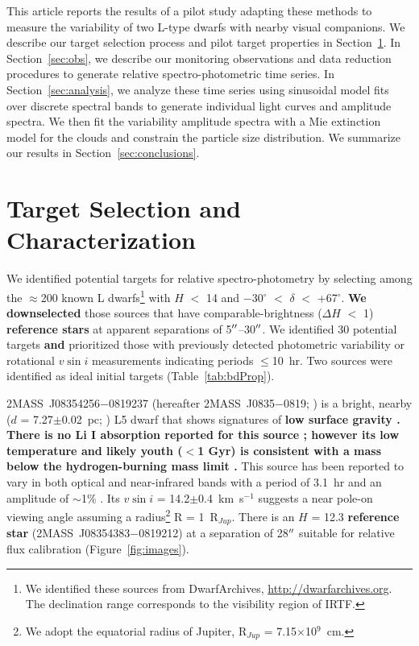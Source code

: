 \documentclass[twocolumn]{aastex6}
\newcommand{\degree}{$^\circ$}
\newcommand{\kms}{km~s$^{-1}$}
\newcommand{\rjup}{R$_{Jup}$}
\newcommand{\sha}{2MASS~J0835$-$0819}
\begin{document}
This article reports the results of a pilot study adapting these methods to measure the variability of two L-type dwarfs with nearby visual companions. We describe our target selection process and pilot target properties in Section~\ref{sec:targets}.
In Section~\ref{sec:obs}, we describe our monitoring observations and data reduction procedures to generate relative spectro-photometric time series.
In Section~\ref{sec:analysis}, we analyze these time series using sinusoidal model fits over discrete spectral bands to generate individual light curves and amplitude spectra.
We then fit the variability amplitude spectra with a Mie extinction model for the clouds and constrain the particle size distribution.
We summarize our results in Section~\ref{sec:conclusions}.

\section{Target Selection and Characterization}\label{sec:targets}

We identified potential targets for relative spectro-photometry by selecting among the $\approx$200 known L dwarfs\footnote{We identified these sources from DwarfArchives,  \url{http://dwarfarchives.org}. The declination range corresponds to the visibility region of IRTF.} with $H$ $<$ 14 and $-$30{\degree}  $<$ $\delta$ $<$ +67{\degree}.
\textbf{We downselected} those sources that have comparable-brightness ($\Delta{H}$ $<$ 1) \textbf{reference stars} at apparent separations of 5$\mbox{$^{\prime\prime}$}$--30$\mbox{$^{\prime\prime}$}$.
We identified 30 potential targets \textbf{and} prioritized those with previously detected photometric variability or rotational $v\sin{i}$ measurements indicating periods $\leq$10~hr.  Two sources were identified as ideal initial targets (Table~\ref{tab:bdProp}).

2MASS~J08354256$-$0819237 (hereafter {\sha}; \citealt{2003AJ....126.2421C}) is a bright, nearby ($d$ = 7.27$\pm$0.02~pc; \citealt{2016AJ....152...24W}) L5 dwarf that shows signatures of \textbf{low surface gravity \citep[][however, see \citet{2015ApJS..219...33G}]{2016ApJ...833...96L}. 
There is no Li I absorption reported for this source \citep{2003AJ....126.2421C,2015ApJS..220...18B}; however its low temperature \citep[T$_{eff}$=1800~K][]{2015ApJS..219...33G} and likely youth ($<$1 Gyr) is consistent with a mass below the hydrogen-burning mass limit \citep{2003A&A...402..701B,2000ApJ...531..438B}.}
This source has been reported to vary in both optical and near-infrared bands with a period of 3.1~hr and an amplitude of $\sim$1\%  \citep{2004MNRAS.354..378K,2014A&A...566A.111W}.
Its $v\sin{i}$ = 14.2$\pm$0.4~{\kms} \citep{2010ApJ...723..684B} suggests a near pole-on viewing angle assuming a radius\footnote{We adopt the equatorial radius of Jupiter, {\rjup} = 7.15$\times$10$^9$~cm.} R = 1~{\rjup}.
There is an $H$ = 12.3 \textbf{reference star} (2MASS~J08354383$-$0819212) at a separation of 28$\mbox{$^{\prime\prime}$}$ suitable for relative flux calibration (Figure~\ref{fig:images}). 
\end{document}
